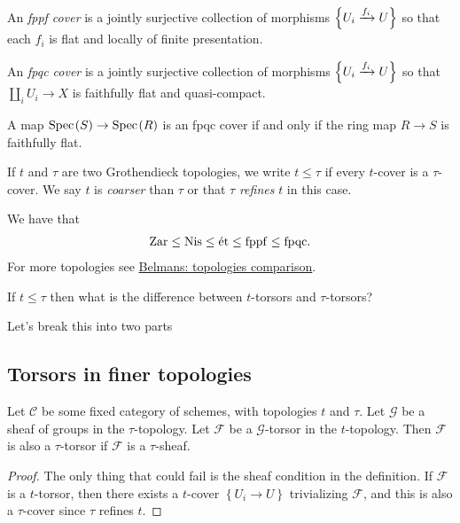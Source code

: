 \documentclass[11pt]{amsart}
\begin{document}
\begin{example} \cite[021M]{Stacks} An \textit{fppf cover} is a jointly surjective collection of morphisms $\left\{ U_i \xrightarrow{f_i} U \right\}$ so that each $f_i$ is flat and locally of finite presentation.
\end{example}

\begin{example} \cite[03NW]{Stacks} An \textit{fpqc cover} is a jointly surjective collection of morphisms $\left\{ U_i \xrightarrow{f_i} U \right\}$ so that $\amalg_i U_i \to X$ is faithfully flat and quasi-compact.
\end{example}

\begin{example} A map $\text{Spec}\hspace{0.1em}(S) \to \text{Spec}\hspace{0.1em}(R)$ is an fpqc cover if and only if the ring map $R\to S$ is faithfully flat.
\end{example}



\begin{terminology} If $t$ and $\tau$ are two Grothendieck topologies, we write $t\le \tau$ if every $t$-cover is a $\tau$-cover. We say $t$ is \textit{coarser} than $\tau$ or that $\tau$ \textit{refines} $t$ in this case.
\end{terminology}

\begin{proposition} We have that
\begin{align*}
    \mathrm{Zar} \le \mathrm{Nis} \le \text{\'{e}t} \le \mathrm{fppf} \le \mathrm{fpqc}.
\end{align*}
For more topologies see \href{https://pbelmans.ncag.info/topologies-comparison/}{Belmans: topologies comparison}.
\end{proposition}

\begin{question} If $t \le \tau$ then what is the difference between $t$-torsors and $\tau$-torsors?
\end{question}

Let's break this into two parts

\subsection{Torsors in finer topologies}

\begin{proposition}\label{prop:torsor-in-finer-topology-if-sheaf} 
Let $\mathscr{C}$ be some fixed category of schemes, with topologies $t$ and $\tau$. Let $\mathcal{G}$ be a sheaf of groups in the $\tau$-topology. Let $\mathcal{F}$ be a $\mathcal{G}$-torsor in the $t$-topology. Then $\mathcal{F}$ is also a $\tau$-torsor if $\mathcal{F}$ is a $\tau$-sheaf.
\end{proposition}
\begin{proof} The only thing that could fail is the sheaf condition in the definition. If $\mathcal{F}$ is a $t$-torsor, then there exists a $t$-cover $\left\{ U_i \to U \right\}$ trivializing $\mathcal{F}$, and this is also a $\tau$-cover since $\tau$ refines $t$. 
\end{proof}
\end{document}
